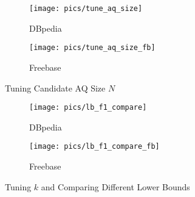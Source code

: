 \vspace{-0.1in}
\begin{figure} [h]
	\newcommand{\mywidth}{0.22\textwidth}
	\centering
	\begin{subfigure}[t]{\mywidth}
		\centering
		\scalebox{0.45}
		{
			\texttt{[image: pics/tune\_aq\_size]}
			
		}
		\vspace{-0.2in}
		\caption{DBpedia}
		\label{fig:chooseoptn_dbpedia}
	\end{subfigure}
	\begin{subfigure}[t]{\mywidth}
		\centering
		\scalebox{0.45}
		{
			\texttt{[image: pics/tune\_aq\_size\_fb]}
		}
		\vspace{-0.2in}
		\caption{Freebase}
		\label{fig:chooseoptn_freebase}
	\end{subfigure}
	\vspace{-0.1in}
	\caption{Tuning Candidate AQ Size $N$}
	\vspace{-0.2in}
	\label{fig:chooseoptn}
\end{figure}

\begin{figure} [h]
	\newcommand{\mywidth}{0.22\textwidth}
	\centering
	\begin{subfigure}[t]{\mywidth}
		\centering
		\scalebox{0.45}
		{
			\texttt{[image: pics/lb\_f1\_compare]}
			
		}
		\vspace{-0.2in}
		\caption{DBpedia}
		\label{fig:lb_f1_dbpedia}
	\end{subfigure}
	\begin{subfigure}[t]{\mywidth}
		\centering
		\scalebox{0.45}
		{
			\texttt{[image: pics/lb\_f1\_compare\_fb]}
		}
		\vspace{-0.2in}
		\caption{Freebase}
		
		\label{fig:lb_f1_freebase}
	\end{subfigure}
	\vspace{-0.1in}
	\caption{Tuning $k$ and Comparing Different Lower Bounds}
	\label{fig:lb_f1}
	\vspace{-0.1in}
\end{figure}


